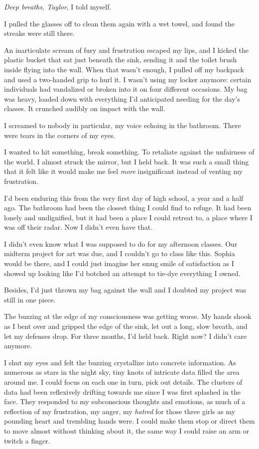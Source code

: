 {\em Deep breaths, Taylor}, I told myself.

I pulled the glasses off to clean them again with a wet towel, and found the streaks were still there.

An inarticulate scream of fury and frustration escaped my lips, and I kicked the plastic bucket that sat just beneath the sink, sending it and the toilet brush inside flying into the wall. When that wasn't enough, I pulled off my backpack and used a two-handed grip to hurl it. I wasn't using my locker anymore: certain individuals had vandalized or broken into it on four different occasions. My bag was heavy, loaded down with everything I'd anticipated needing for the day's classes. It crunched audibly on impact with the wall.

 I screamed to nobody in particular, my voice echoing in the bathroom. There were tears in the corners of my eyes.

 I wanted to hit something, break something. To retaliate against the unfairness of the world. I almost struck the mirror, but I held back. It was such a small thing that it felt like it would make me feel {\em more} insignificant instead of venting my frustration.

I'd been enduring this from the very first day of high school, a year and a half ago. The bathroom had been the closest thing I could find to refuge. It had been lonely and undignified, but it had been a place I could retreat to, a place where I was off their radar. Now I didn't even have that.

I didn't even know what I was supposed to do for my afternoon classes. Our midterm project for art was due, and I couldn't go to class like this. Sophia would be there, and I could just imagine her smug smile of satisfaction as I showed up looking like I'd botched an attempt to tie-dye everything I owned.

Besides, I'd just thrown my bag against the wall and I doubted my project was still in one piece.

The buzzing at the edge of my consciousness was getting worse. My hands shook as I bent over and gripped the edge of the sink, let out a long, slow breath, and let my defenses drop. For three months, I'd held back. Right now? I didn't care anymore.

I shut my eyes and felt the buzzing crystallize into concrete information. As numerous as stars in the night sky, tiny knots of intricate data filled the area around me. I could focus on each one in turn, pick out details. The clusters of data had been reflexively drifting towards me since I was first splashed in the face. They responded to my subconscious thoughts and emotions, as much of a reflection of my frustration, my anger, my {\em hatred} for those three girls as my pounding heart and trembling hands were. I could make them stop or direct them to move almost without thinking about it, the same way I could raise an arm or twitch a finger.

